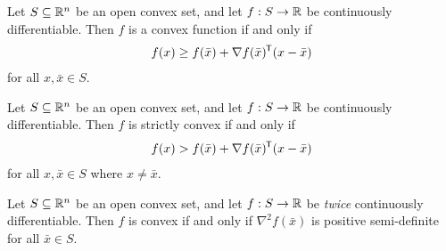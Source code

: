 \begin{thm}\label{convex-function-tangent-hyperplane}
    Let $S \subseteq \mathbb{R}^n$ be an open convex set, and let $f: S \to \mathbb{R}$ be continuously differentiable. Then $f$ is a convex function if and only if
    \begin{align*}
        f(x) \geq f(\bar{x}) + \nabla f(\bar{x})^{\mkern-1.5mu\mathsf{T}}(x - \bar{x})
    \end{align*}
    for all $x, \bar{x} \in S$. 
\end{thm}

\begin{thm}
    Let $S \subseteq \mathbb{R}^n$ be an open convex set, and let $f: S \to \mathbb{R}$ be continuously differentiable. Then $f$ is strictly convex if and only if 
    \begin{align*}
        f(x) > f(\bar{x}) + \nabla f(\bar{x})^{\mkern-1.5mu\mathsf{T}}(x - \bar{x})
    \end{align*}
    for all $x, \bar{x} \in S$ where $x \neq \bar{x}$. 
\end{thm}

\begin{cor}
    Let $S \subseteq \mathbb{R}^n$ be an open convex set, and let $f: S \to \mathbb{R}$ be \emph{twice} continuously differentiable. Then $f$ is convex if and only if $\nabla^2f(\bar{x})$ is positive semi-definite for all $\bar{x} \in S$.
\end{cor}

